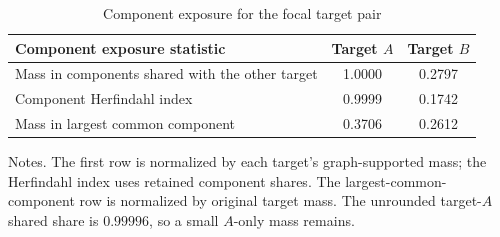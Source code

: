 \begin{table}[H]
\centering
\caption{Component exposure for the focal target pair}
\label{tab:component-exposure}
\footnotesize
\renewcommand{\arraystretch}{1.05}
\begin{tabular}{lcc}
\toprule
Component exposure statistic & Target $A$ & Target $B$ \\
\midrule
Mass in components shared with the other target & 1.0000 & 0.2797 \\
Component Herfindahl index & 0.9999 & 0.1742 \\
Mass in largest common component & 0.3706 & 0.2612 \\
\bottomrule
\end{tabular}
\begin{minipage}{0.88\textwidth}
\footnotesize Notes. The first row is normalized by each target's graph-supported mass; the Herfindahl index uses retained component shares. The largest-common-component row is normalized by original target mass. The unrounded target-$A$ shared share is $0.99996$, so a small $A$-only mass remains.
\end{minipage}
\end{table}

